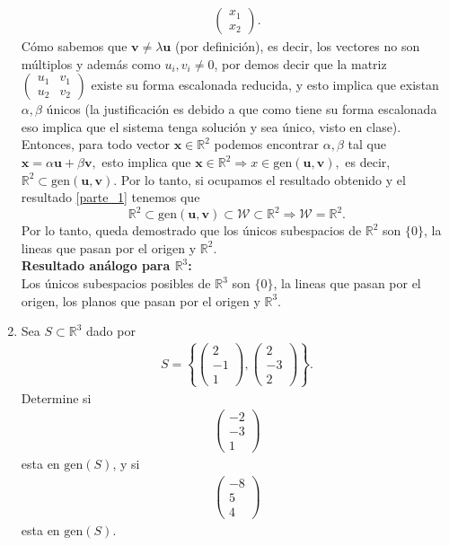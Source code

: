 \documentclass[11pt,letterpaper]{article}
\newcommand{\mR}{\mathbb{R}}
\newcommand{\gen}{\text{gen}}
\begin{document}
\begin{enumerate}
\begin{align*}
\begin{pmatrix}
x_1\\
x_2
\end{pmatrix}.
\end{align*}
Cómo sabemos que $\textbf{v}\neq\lambda\textbf{u}$ (por definición), es decir, los vectores no son múltiplos y además como $u_i, v_i\neq 0$, por demos decir que la matriz $\begin{pmatrix}
u_1&v_1\\
u_2&v_2
\end{pmatrix}$ existe su forma escalonada reducida, y esto implica que existan $\alpha, \beta$ únicos (la justificación es debido a que como tiene su forma escalonada eso implica que el sistema tenga solución y sea único, visto en clase). Entonces, para todo vector $\textbf{x}\in \mR^2$ podemos encontrar $\alpha, \beta$ tal que $\textbf{x}=\alpha\textbf{u}+\beta\textbf{v},$ esto implica que $\textbf{x}\in \mR^2\Rightarrow x \in \gen(\textbf{u},\textbf{v}),$ es decir, $\mR^2\subset \gen(\textbf{u},\textbf{v}).$ Por lo tanto, si ocupamos el resultado obtenido y el resultado \ref{parte_1} tenemos que 
$$\mR^2\subset \gen(\textbf{u},\textbf{v})\subset \mathcal{W} \subset\mR^2\Rightarrow \mathcal{W}=\mR^2.$$
Por lo tanto, queda demostrado que los únicos subespacios de $\mR^2$ son $\{0\}$, la lineas que pasan por el origen y $\mR^2$.\\

\textbf{Resultado análogo para $\mR^3$:}\\
Los únicos subespacios posibles de $\mR^3$ son $\{0\}$, la lineas que pasan por el origen, los planos que pasan por el origen y $\mR^3$.  

\item Sea $S\subset \mR^3$ dado por 
\begin{align*}
S=\left\{\begin{pmatrix}
2\\
-1\\
1
\end{pmatrix}, \begin{pmatrix}
2\\
-3\\
2
\end{pmatrix} \right\}.
\end{align*}
Determine si \begin{align*}
\begin{pmatrix}
-2\\
-3\\
1
\end{pmatrix}
\end{align*}
esta en $\text{gen}(S)$, y si \begin{align*}
\begin{pmatrix}
-8\\
5\\
4
\end{pmatrix}
\end{align*}
esta en $\text{gen}(S)$.


\end{enumerate}
\end{document}
